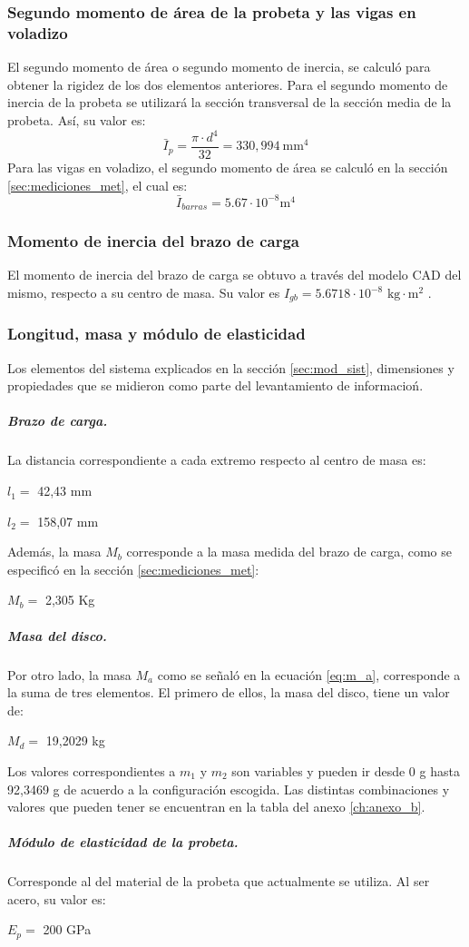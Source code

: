\subsubsection{Segundo momento de área de la probeta y las vigas en voladizo}
El segundo momento de área o segundo momento de inercia, se calculó para obtener la rigidez de los dos elementos anteriores. Para el segundo momento de inercia de la probeta se utilizará la sección transversal de la sección media de la probeta. Así, su valor es:
\begin{equation}
	\bar{I}_p = \frac{\pi \cdot d^4}{32} = 330,994\: \text{mm}^4
\end{equation}
Para las vigas en voladizo, el segundo momento de área se calculó en la sección \ref{sec:mediciones_met}, el cual es:
\begin{equation}
	\bar{I}_{barras} = 5.67 \cdot 10^{-8} \text{m}^4
\end{equation}
\subsubsection{Momento de inercia del brazo de carga}
El momento de inercia del brazo de carga se obtuvo a través del modelo CAD del mismo, respecto a su centro de masa. Su valor es $I_{gb} = 5.6718\cdot 10^{-8} \text{ kg}\cdot \text{m}^2$ . 

\subsubsection{Longitud, masa y módulo de elasticidad}
Los elementos del sistema explicados en la sección \ref{sec:mod_sist}, dimensiones y propiedades que se midieron como parte del levantamiento de informacioń. 
\subparagraph{\textit{Brazo de carga.}}
La distancia correspondiente a cada extremo respecto al centro de masa es:
\begin{itemize*}
	\item $l_1=$ 42,43 mm
	\item $l_2=$ 158,07 mm
\end{itemize*}
Además, la masa $M_b$ corresponde a la masa medida del brazo de carga, como se especificó en la sección \ref{sec:mediciones_met}:
\begin{itemize*}
	\item $M_b=$ 2,305 Kg
\end{itemize*}
\subparagraph{\textit{Masa del disco}.}
Por otro lado, la masa $M_a$ como se señaló en la ecuación \ref{eq:m_a}, corresponde a la suma de tres elementos. El primero de ellos, la masa del disco, tiene un valor de:
\begin{itemize*}
	\item $M_d=$ 19,2029 kg
\end{itemize*}
Los valores correspondientes a $m_1$ y $m_2$ son variables y pueden ir desde 0 g hasta 92,3469 g de acuerdo a la configuración escogida. Las distintas combinaciones y valores que pueden tener se encuentran en la tabla del anexo \ref{ch:anexo_b}.
\subparagraph{Módulo de elasticidad de la probeta.}
Corresponde al del material de la probeta que actualmente se utiliza. Al ser acero, su valor es:
\begin{itemize*}
	\item $E_p=$ 200 GPa
\end{itemize*}
